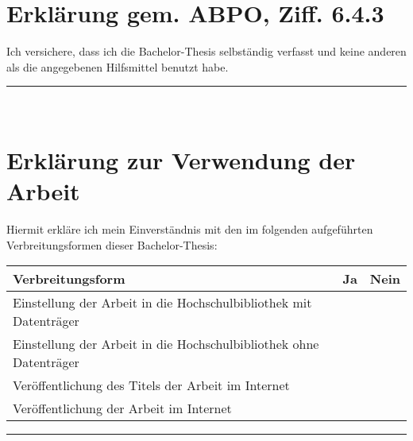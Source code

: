 \section*{Erklärung gem. ABPO, Ziff. 6.4.3}

Ich versichere, dass ich die Bachelor-Thesis selbständig verfasst und keine anderen als die
angegebenen Hilfsmittel benutzt habe.

\vspace{3cm}
\makebox[.45\linewidth][l]{\thecity, \thedate}\hfill\rule{.45\linewidth}{0.5pt}\\
\makebox[.45\linewidth][l]{}\hfill\makebox[.45\linewidth][l]{\theauthor}

\vfill

\section*{Erklärung zur Verwendung der Arbeit}

Hiermit erkläre ich mein Einverständnis mit den im folgenden aufgeführten Verbreitungsformen dieser
Bachelor-Thesis:

\begin{tabularx}{\linewidth}{|R|c|c|}
	\hline
	\textbf{Verbreitungsform} & \textbf{Ja} & \textbf{Nein}
	\\\hline
	Einstellung der Arbeit in die Hochschulbibliothek mit Datenträger &  & 
	\\\hline
	Einstellung der Arbeit in die Hochschulbibliothek ohne Datenträger &  & 
	\\\hline
	Veröffentlichung des Titels der Arbeit im Internet &  & 
	\\\hline
	Veröffentlichung der Arbeit im Internet &  & 
	\\\hline
\end{tabularx}

\vspace{3cm}
\makebox[.45\linewidth][l]{\thecity, \thedate}\hfill\rule{.45\linewidth}{0.5pt}\\
\makebox[.45\linewidth][l]{}\hfill\makebox[.45\linewidth][l]{\theauthor}
